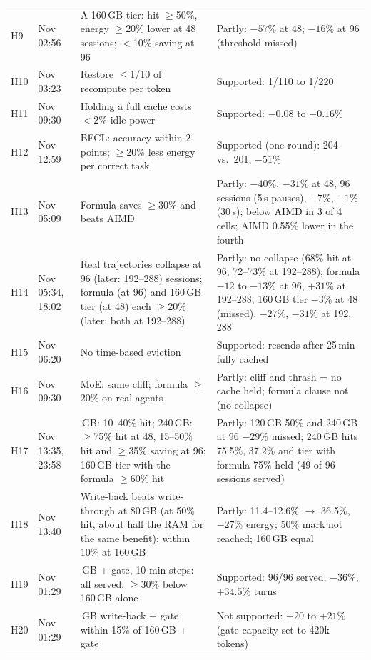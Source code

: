 \begin{table}[p]
\begin{tabular}{p{}>{\raggedright\arraybackslash}p{}>{\raggedright\arraybackslash}p{}>{\raggedright\arraybackslash}p{}}
H9 & 6 Nov 02:56 & A 160\,GB tier: hit $\ge$50\%, energy $\ge$20\% lower at 48 sessions; $<$10\% saving at 96 & Partly: $-57\%$ at 48; $-16\%$ at 96 (threshold missed) \\
H10 & 6 Nov 03:23 & Restore $\le$1/10 of recompute per token & Supported: 1/110 to 1/220 \\
H11 & 6 Nov 09:30 & Holding a full cache costs $<$2\% idle power & Supported: $-0.08$ to $-0.16\%$ \\
H12 & 6 Nov 12:59 & BFCL: accuracy within 2 points; $\ge$20\% less energy per correct task & Supported (one round): 204 vs.\ 201, $-51\%$ \\
H13 & 6 Nov 05:09 & Formula saves $\ge$30\% and beats AIMD & Partly: $-40\%$, $-31\%$ at 48, 96 sessions (5\,s pauses), $-7\%$, $-1\%$ (30\,s); below AIMD in 3 of 4 cells; AIMD 0.55\% lower in the fourth \\
H14 & 6 Nov 05:34, 18:02 & Real trajectories collapse at 96 (later: 192--288) sessions; formula (at 96) and 160\,GB tier (at 48) each $\ge$20\% (later: both at 192--288) & Partly: no collapse (68\% hit at 96, 72--73\% at 192--288); formula $-12$ to $-13\%$ at 96, $+31\%$ at 192--288; 160\,GB tier $-3\%$ at 48 (missed), $-27\%$, $-31\%$ at 192, 288 \\
H15 & 6 Nov 06:20 & No time-based eviction & Supported: resends after 25\,min fully cached \\
H16 & 6 Nov 09:30 & MoE: same cliff; formula $\ge$20\% on real agents & Partly: cliff and thrash = no cache held; formula clause not (no collapse) \\
H17 & 6 Nov 13:35, 23:58 & 120\,GB: 10--40\% hit; 240\,GB: $\ge$75\% hit at 48, 15--50\% hit and $\ge$35\% saving at 96; 160\,GB tier with the formula $\ge$60\% hit & Partly: 120\,GB 50\% and 240\,GB at 96 $-29\%$ missed; 240\,GB hits 75.5\%, 37.2\% and tier with formula 75\% held (49 of 96 sessions served) \\
H18 & 6 Nov 13:40 & Write-back beats write-through at 80\,GB (at 50\% hit, about half the RAM for the same benefit); within 10\% at 160\,GB & Partly: 11.4--12.6\% $\to$ 36.5\%, $-27\%$ energy; 50\% mark not reached; 160\,GB equal \\
H19 & 7 Nov 01:29 & 160\,GB + gate, 10-min steps: all served, $\ge$30\% below 160\,GB alone & Supported: 96/96 served, $-36\%$, $+34.5\%$ turns \\
H20 & 7 Nov 01:29 & 80\,GB write-back + gate within 15\% of 160\,GB + gate & Not supported: $+20$ to $+21\%$ (gate capacity set to 420k tokens) \\

\end{tabular}
\end{table}

